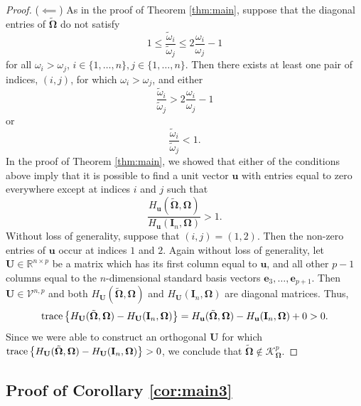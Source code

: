 \documentclass[12pt]{article}
\newcommand{\tr}{\text{\rm trace}}
\newcommand{\bl}[1]{{\mathbf #1}}
\newcommand{\bs}[1]{\boldsymbol #1}
\begin{document}
\begin{proof}
($\impliedby$) As in the proof of Theorem \ref{thm:main}, suppose that the diagonal entries of $\tilde{\bs{\Omega}}$ do not satisfy
\begin{equation*}
    1 \leq \frac{\tilde{\omega}_i}{\tilde{\omega}_j} \leq 2\frac{\omega_i}{\omega_j} - 1
\end{equation*}
for all $\omega_i > \omega_j$, $i \in \{1, \dots, n\}, j \in \{1, \dots, n\}$. Then there exists at least one pair of indices, $(i,j)$, for which $\omega_i > \omega_j$, and either
\begin{equation*}
    \frac{\tilde{\omega}_i}{\tilde{\omega}_j} > 2\frac{\omega_i}{\omega_j} - 1
\end{equation*}
or
\begin{equation*}
    \frac{\tilde{\omega}_i}{\tilde{\omega}_j} < 1.
\end{equation*}
In the proof of Theorem \ref{thm:main}, we showed that either of the conditions above imply that it is possible to find a unit vector $\bl{u}$ with entries equal to zero everywhere except at indices $i$ and $j$ such that 
\begin{equation*}
    \frac{H_{\bl{u}}(\tilde{\bs{\Omega}}, \bs{\Omega})}{H_{\bl{u}}(\bl{I}_n, \bs{\Omega})} > 1.
\end{equation*}
Without loss of generality, suppose that $(i,j) = (1,2)$. Then the non-zero entries of $\bl{u}$ occur at indices $1$ and $2$. Again without loss of generality, let $\bl{U} \in \mathbb{R}^{n \times p}$ be a matrix which has its first column equal to $\bl{u}$, and all other $p-1$ columns equal to the $n$-dimensional standard basis vectors $\bs{e}_3, \dots, \bs{e}_{p+1}$. Then $\bl{U} \in \mathcal{V}^{n,p}$ and both $H_{\bl{U}}(\tilde{\bs{\Omega}}, \bs{\Omega})$ and $H_{\bl{U}}(\bl{I}_n, \bs{\Omega})$ are diagonal matrices. Thus,
\begin{equation*}
    \tr \left\{H_{\bl{U}}(\tilde{\bs{\Omega}}, \bs{\Omega}) - H_{\bl{U}}(\bl{I}_n, \bs{\Omega}) \right\} = H_{\bl{u}}(\tilde{\bs{\Omega}}, \bs{\Omega}) - H_{\bl{u}}(\bl{I}_n, \bs{\Omega}) +  0  > 0.
\end{equation*}
Since we were able to construct an orthogonal $\bl{U}$ for which $\tr \left\{H_{\bl{U}}(\tilde{\bs{\Omega}}, \bs{\Omega}) - H_{\bl{U}}(\bl{I}_n, \bs{\Omega}) \right\} > 0$, we conclude that $\tilde{\bs{\Omega}} \notin \mathcal{K}^p_{\bs{\Omega}}$.
\end{proof}

\subsection{{Proof of Corollary \ref{cor:main3}}}
\end{document}
